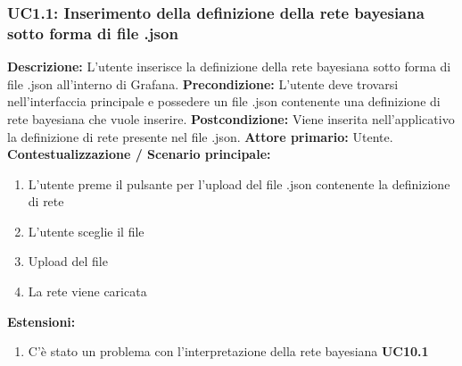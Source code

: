                 \subsubsection{UC1.1: Inserimento della definizione della rete bayesiana sotto forma di file .json}
                    \textbf{Descrizione:} L'utente inserisce la definizione della rete bayesiana sotto forma di file .json all'interno di Grafana.
                    \newline
                    \textbf{Precondizione:}  L’utente deve trovarsi nell’interfaccia principale e possedere un file .json contenente una definizione di rete bayesiana che vuole inserire.
                    \newline
                    \textbf{Postcondizione:} Viene inserita nell’applicativo la definizione di rete presente nel file .json.
                    \newline
                    \textbf{Attore primario:} Utente.
                    \newline
                    \textbf{Contestualizzazione / Scenario principale:} \begin{enumerate}
                        \item L’utente preme il pulsante per l’upload del file .json contenente la definizione di rete
                        \item L’utente sceglie il file
                        \item Upload del file
                        \item La rete viene caricata
                    \end{enumerate}
                    
                    \textbf{Estensioni:} \begin{enumerate}
                            \item C’è stato un problema con l’interpretazione della rete bayesiana \textbf{UC10.1}
                        \end{enumerate}
                        
